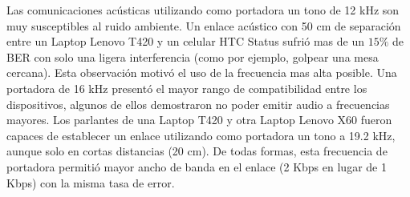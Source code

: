 Las comunicaciones acústicas utilizando como portadora un tono de 12 kHz son muy susceptibles al ruido ambiente. Un enlace acústico con 50 cm de separación entre un Laptop Lenovo T420 y un celular HTC Status sufrió mas de un $15\%$ de BER con solo una ligera interferencia (como por ejemplo, golpear una mesa cercana). Esta observación motivó el uso de la frecuencia mas alta posible. Una portadora de 16 kHz presentó el mayor rango de compatibilidad entre los dispositivos, algunos de ellos demostraron no poder emitir audio a frecuencias mayores.
Los parlantes de una Laptop T420 y otra Laptop Lenovo X60 fueron capaces de establecer un enlace utilizando como portadora un tono a 19.2 kHz, aunque solo en cortas distancias (20 cm). De todas formas, esta frecuencia de portadora permitió mayor ancho de banda en el enlace (2 Kbps en lugar de 1 Kbps) con la misma tasa de error.

%
